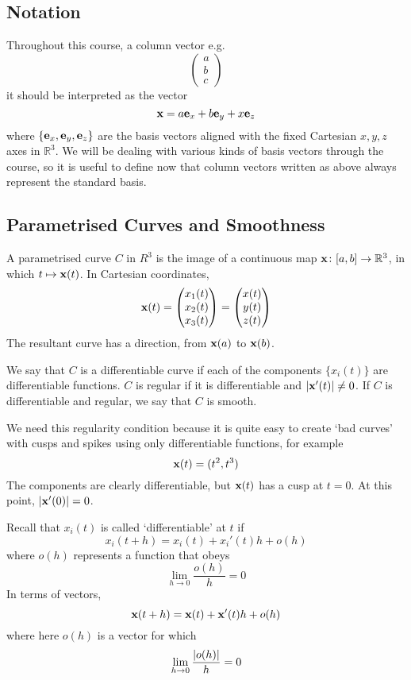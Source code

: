 \subsection{Notation}
Throughout this course, a column vector e.g.
\[ \begin{pmatrix}
		a \\ b \\ c
	\end{pmatrix} \]
it should be interpreted as the vector
\[ \vb x = a \vb e_x + b \vb e_y + x \vb e_z \]
where $\{ \vb e_x, \vb e_y, \vb e_z \}$ are the basis vectors aligned with the fixed Cartesian $x, y, z$ axes in $\mathbb R^3$. We will be dealing with various kinds of basis vectors through the course, so it is useful to define now that column vectors written as above always represent the standard basis.

\subsection{Parametrised Curves and Smoothness}
A parametrised curve $C$ in $R^3$ is the image of a continuous map $\vb x \colon [a, b] \to \mathbb R^3$, in which $t \mapsto \vb x(t)$. In Cartesian coordinates,
\[ \vb x(t) = \begin{pmatrix}
		x_1(t) \\ x_2(t) \\ x_3(t)
	\end{pmatrix} = \begin{pmatrix}
		x(t) \\ y(t) \\ z(t)
	\end{pmatrix} \]
The resultant curve has a direction, from $\vb x(a)$ to $\vb x(b)$.
\begin{definition}
	We say that $C$ is a differentiable curve if each of the components $\{x_i(t)\}$ are differentiable functions. $C$ is regular if it is differentiable and $\abs{\vb x'(t)} \neq 0$. If $C$ is differentiable and regular, we say that $C$ is smooth.
\end{definition}
\begin{note}
	We need this regularity condition because it is quite easy to create `bad curves' with cusps and spikes using only differentiable functions, for example
	\[ \vb x(t) = (t^2, t^3) \]
	The components are clearly differentiable, but $\vb x(t)$ has a cusp at $t = 0$. At this point, $\abs{\vb x'(0)} = 0$.
\end{note}
\begin{definition}
	Recall that $x_i(t)$ is called `differentiable' at $t$ if
	\[ x_i(t+h) = x_i(t) + x_i'(t)h + o(h) \]
	where $o(h)$ represents a function that obeys
	\[ \lim_{h \to 0} \frac{o(h)}{h} = 0 \]
	In terms of vectors,
	\[ \vb x(t+h) = \vb x(t) + \vb x'(t)h + o(h) \]
	where here $o(h)$ is a vector for which
	\[ \lim_{h \to 0} \frac{\abs{o(h)}}{h} = 0 \]
\end{definition}

